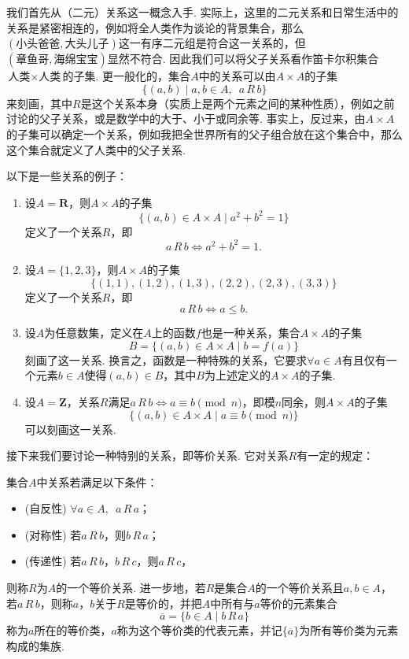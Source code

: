 我们首先从（二元）关系这一概念入手. 实际上，这里的二元关系和日常生活中的关系是紧密相连的，例如将全人类作为谈论的背景集合，那么$(\text{小头爸爸}, \text{大头儿子})$这一有序二元组是符合这一关系的，但$(\text{章鱼哥}, \text{海绵宝宝})$显然不符合. 因此我们可以将父子关系看作笛卡尔积集合$\text{人类}\times\text{人类}$的子集. 更一般化的，集合$A$中的关系可以由$A\times A$的子集
\[\{(a,b) \mid a,b\in A, \enspace a\,R\,b\}\]
来刻画，其中$R$是这个关系本身（实质上是两个元素之间的某种性质），例如之前讨论的父子关系，或是数学中的大于、小于或同余等. 事实上，反过来，由$A\times A$的子集可以确定一个关系，例如我把全世界所有的父子组合放在这个集合中，那么这个集合就定义了人类中的父子关系.
\begin{example}
    以下是一些关系的例子：
    \begin{enumerate}
        \item 设$A=\mathbf{R}$，则$A\times A$的子集
              \[\{(a,b)\in A\times A \mid a^2+b^2=1\}\]
              定义了一个关系$R$，即
              \[a\,R\,b \iff a^2+b^2=1.\]

        \item 设$A=\{1,2,3\}$，则$A\times A$的子集
              \[\{(1,1),(1,2),(1,3),(2,2),(2,3),(3,3)\}\]
              定义了一个关系$R$，即
              \[a\,R\,b \iff a\leqslant b.\]

        \item 设$A$为任意数集，定义在$A$上的函数$f$也是一种关系，集合$A\times A$的子集
              \[B=\{(a,b)\in A\times A \mid b=f(a)\}\]
              刻画了这一关系. 换言之，函数是一种特殊的关系，它要求$\forall a\in A$有且仅有一个元素$b\in A$使得$(a,b)\in B$，其中$B$为上述定义的$A\times A$的子集.

        \item 设$A=\mathbf{Z}$，关系$R$满足$a\,R\,b\iff a\equiv b \pmod n$，即模$n$同余，则$A\times A$的子集
              \[\{(a,b)\in A\times A \mid a\equiv b \pmod n\}\]
              可以刻画这一关系.
    \end{enumerate}
\end{example}

接下来我们要讨论一种特别的关系，即等价关系. 它对关系$R$有一定的规定：
\begin{definition}\label{def:1:等价关系}
    集合$A$中关系若满足以下条件：
    \begin{itemize}
        \item (自反性) $\forall a\in A, \enspace a\,R\,a$；

        \item (对称性) 若$a\,R\,b$，则$b\,R\,a$；

        \item (传递性) 若$a\,R\,b$，$b\,R\,c$，则$a\,R\,c$，
    \end{itemize}
    则称$R$为$A$的一个等价关系. 进一步地，若$R$是集合$A$的一个等价关系且$a,b\in A$，若$a\,R\,b$，则称$a$，$b$关于$R$是等价的，并把$A$中所有与$a$等价的元素集合
    \[\overline{a}=\{b\in A \mid b\,R\,a\}\]
    称为$a$所在的等价类，$a$称为这个等价类的代表元素，并记$\{\overline{a}\}$为所有等价类为元素构成的集族.
\end{definition}

